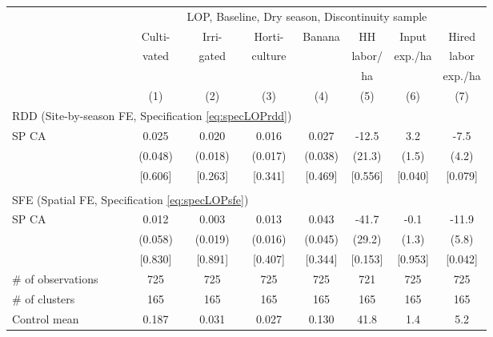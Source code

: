 \begin{tabular}{lccccccc}
\hline \hline
 & \multicolumn{7}{c}{LOP, Baseline, Dry season, Discontinuity sample} \\
\cmidrule(lr){2-8}
 & Culti- & Irri- & Horti- & Banana & HH & Input & Hired \\
 & vated & gated & culture & & labor/ & exp./ha & labor \\
 & & & & & ha & & exp./ha \\
\cmidrule(lr){2-2}\cmidrule(lr){3-3}\cmidrule(lr){4-4}\cmidrule(lr){5-5}\cmidrule(lr){6-6}\cmidrule(lr){7-7}\cmidrule(lr){8-8}
 & (1) & (2) & (3) & (4) & (5) & (6) & (7) \\
\hline
\multicolumn{4}{l}{RDD (Site-by-season FE, Specification \ref{eq:specLOPrdd})} & & & & \\
\cmidrule(lr){1-4}
SP CA & 0.025 & 0.020 & 0.016 & 0.027 & -12.5\hphantom{-} & 3.2 & -7.5\hphantom{-} \\
 & (0.048) & (0.018) & (0.017) & (0.038) & (21.3) & (1.5) & (4.2) \\
 & [0.606] & [0.263] & [0.341] & [0.469] & [0.556] & [0.040] & [0.079] \\
\\[-0.5em]
\multicolumn{4}{l}{SFE (Spatial FE, Specification \ref{eq:specLOPsfe})} & & & & \\
\cmidrule(lr){1-4}
SP CA & 0.012 & 0.003 & 0.013 & 0.043 & -41.7\hphantom{-} & -0.1\hphantom{-} & -11.9\hphantom{-} \\
 & (0.058) & (0.019) & (0.016) & (0.045) & (29.2) & (1.3) & (5.8) \\
 & [0.830] & [0.891] & [0.407] & [0.344] & [0.153] & [0.953] & [0.042] \\
\hline
\# of observations & 725 & 725 & 725 & 725 & 721 & 725 & 725 \\
\# of clusters & 165 & 165 & 165 & 165 & 165 & 165 & 165 \\
Control mean & 0.187 & 0.031 & 0.027 & 0.130 & 41.8 & 1.4 & 5.2 \\
\hline
\end{tabular}
